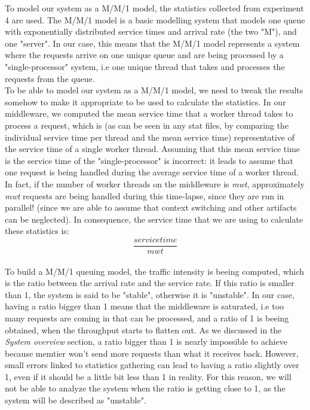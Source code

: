 \documentclass[11pt,a4paper]{article}
\begin{document}
To model our system as a M/M/1 model, the statistics collected from experiment 4 are used. 
The M/M/1 model is a basic modelling system that models one queue with exponentially distributed  service times and arrival rate (the two "M"), and one "server". In our case, this means that the M/M/1 model represents a system where the requests arrive on one unique queue and are being processed by a "single-processor" system, i.e one unique thread that takes and processes the requests from the queue.
\\
To be able to model our system as a M/M/1 model, we need to tweak the results somehow to make it appropriate to be used to calculate the statistics. In our middleware, we computed the mean service time that a worker thread takes to process a request, which is (as can be seen in any stat files, by comparing the individual service time per thread and the mean service time) representative of the service time of a single worker thread. Assuming that this mean service time is the service time of the "single-processor" is incorrect: it leads to assume that one request is being handled during the average service time of a worker thread. In fact, if the number of worker threads on the middleware is \textit{mwt}, approximately \textit{mwt} requests are being handled during this time-lapse, since they are run in parallel! (since we are able to assume that context switching and other artifacts can be neglected). In consequence, the service time that we are using to calculate these statistics is: 
\[\frac{service time}{mwt}\]
\\
To build a M/M/1 queuing model, the traffic intensity is beeing computed, which is the ratio between the arrival rate and the service rate. If this ratio is smaller than 1, the system is said to be "stable", otherwise it is "unstable". In our case, having a ratio bigger than 1 means that the middleware is saturated, i.e too many requests are coming in that can be processed, and a ratio of 1 is beeing obtained, when the throughput starts to flatten out. As we discussed in the \textit{System overview} section, a ratio bigger than 1 is nearly impossible to achieve because memtier won't send more requests than what it receives back. However, small errors linked to statistics gathering can lead to having a ratio slightly over 1, even if it should be a little bit less than 1 in reality. For this reason, we will not be able to analyze the system when the ratio is getting close to 1, as the system will be described as "unstable".
\\\\
\end{document}
